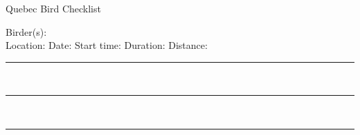 \documentclass{article}
\newcommand{\newnoteline}{\rule{\textwidth}{0.15mm}\\[1.5ex]}
\begin{document}
\centering
\LARGE{Quebec Bird Checklist}\\
\normalsize \raggedright


Birder(s): \underline{\hspace{112ex}}\\[1.5ex]
Location: \underline{\hspace{28ex}}    Date: \underline{\hspace{13ex}}    Start time: \underline{\hspace{10ex}}   Duration: \underline{\hspace{10ex}}    Distance: \underline{\hspace{10ex}}\\[1.5ex]


\newnoteline\newnoteline\newnoteline


\begin{center}


\end{center}
\end{document}
